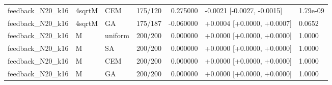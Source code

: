 \begin{tabular}{llllrll}
feedback\_N20\_k16 & 4sqrtM & CEM & 175/120 & 0.275000 & -0.0021 [-0.0027, -0.0015] & 1.79e-09 \\
feedback\_N20\_k16 & 4sqrtM & GA & 175/187 & -0.060000 & +0.0004 [+0.0000, +0.0007] & 0.0652 \\
feedback\_N20\_k16 & M & uniform & 200/200 & 0.000000 & +0.0000 [+0.0000, +0.0000] & 1.0000 \\
feedback\_N20\_k16 & M & SA & 200/200 & 0.000000 & +0.0000 [+0.0000, +0.0000] & 1.0000 \\
feedback\_N20\_k16 & M & CEM & 200/200 & 0.000000 & +0.0000 [+0.0000, +0.0000] & 1.0000 \\
feedback\_N20\_k16 & M & GA & 200/200 & 0.000000 & +0.0000 [+0.0000, +0.0000] & 1.0000 \\
\bottomrule
\end{tabular}
